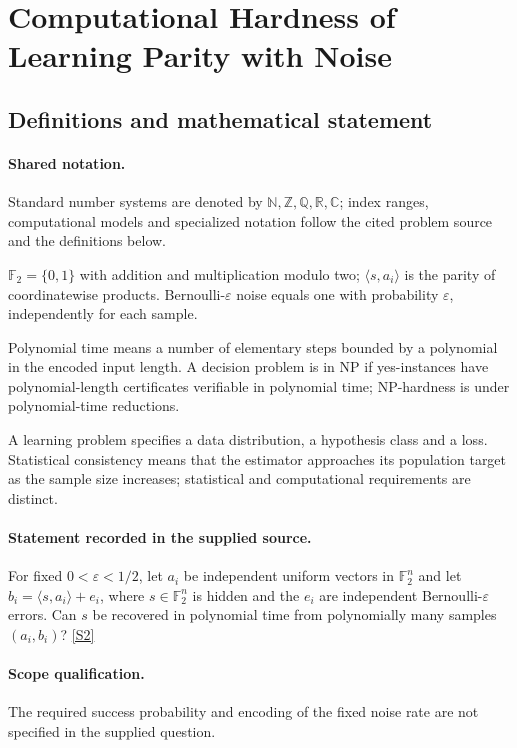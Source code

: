 \documentclass[11pt]{article}
\newcommand{\sref}[2]{\hyperlink{source:#1:#2}{[S#2]}}
\begin{document}
\section{Computational Hardness of Learning Parity with Noise}\label{statement}

\subsection{Definitions and mathematical statement}

\paragraph{Shared notation.}Standard number systems are denoted by $\mathbb N,\mathbb Z,\mathbb Q,\mathbb R,\mathbb C$; index ranges, computational models and specialized notation follow the cited problem source and the definitions below.


$\mathbb F_2=\{0,1\}$ with addition and multiplication modulo two; $\langle s,a_i\rangle$ is the parity of coordinatewise products. Bernoulli-$\varepsilon$ noise equals one with probability $\varepsilon$, independently for each sample.

Polynomial time means a number of elementary steps bounded by a polynomial in the encoded input length. A decision problem is in $\mathrm{NP}$ if yes-instances have polynomial-length certificates verifiable in polynomial time; NP-hardness is under polynomial-time reductions.

A learning problem specifies a data distribution, a hypothesis class and a loss. Statistical consistency means that the estimator approaches its population target as the sample size increases; statistical and computational requirements are distinct.
\paragraph{Statement recorded in the supplied source.}
For fixed $0<\varepsilon<1/2$, let $a_i$ be independent uniform vectors in $\mathbb F_2^n$ and let $b_i=\langle s,a_i\rangle+e_i$, where $s\in\mathbb F_2^n$ is hidden and the $e_i$ are independent Bernoulli-$\varepsilon$ errors. Can $s$ be recovered in polynomial time from polynomially many samples $(a_i,b_i)$? \sref{statement}{2}
\paragraph{Scope qualification.}
The required success probability and encoding of the fixed noise rate are not specified in the supplied question.
\end{document}
